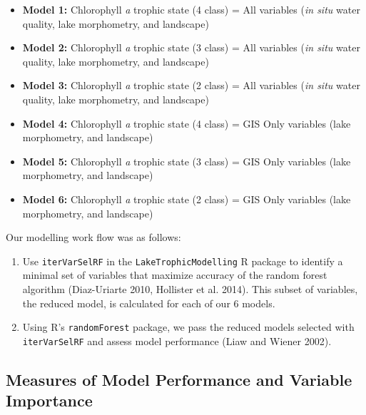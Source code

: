 \documentclass[11pt,]{article}
\begin{document}
\begin{itemize}
\itemsep1pt\parskip0pt
\item
  \textbf{Model 1:} Chlorophyll \emph{a} trophic state (4 class) = All
  variables (\emph{in situ} water quality, lake morphometry, and
  landscape)
\item
  \textbf{Model 2:} Chlorophyll \emph{a} trophic state (3 class) = All
  variables (\emph{in situ} water quality, lake morphometry, and
  landscape)
\item
  \textbf{Model 3:} Chlorophyll \emph{a} trophic state (2 class) = All
  variables (\emph{in situ} water quality, lake morphometry, and
  landscape)
\item
  \textbf{Model 4:} Chlorophyll \emph{a} trophic state (4 class) = GIS
  Only variables (lake morphometry, and landscape)
\item
  \textbf{Model 5:} Chlorophyll \emph{a} trophic state (3 class) = GIS
  Only variables (lake morphometry, and landscape)
\item
  \textbf{Model 6:} Chlorophyll \emph{a} trophic state (2 class) = GIS
  Only variables (lake morphometry, and landscape)
\end{itemize}

Our modelling work flow was as follows:

\begin{enumerate}
\def\labelenumi{\arabic{enumi}.}
\itemsep1pt\parskip0pt
\item
  Use \texttt{iterVarSelRF} in the \texttt{LakeTrophicModelling} R
  package to identify a minimal set of variables that maximize accuracy
  of the random forest algorithm (Diaz-Uriarte 2010, Hollister et al.
  2014). This subset of variables, the reduced model, is calculated for
  each of our 6 models.
\item
  Using R's \texttt{randomForest} package, we pass the reduced models
  selected with \texttt{iterVarSelRF} and assess model performance (Liaw
  and Wiener 2002).
\end{enumerate}

\subsection{Measures of Model Performance and Variable
Importance}\label{measures-of-model-performance-and-variable-importance}
\end{document}
